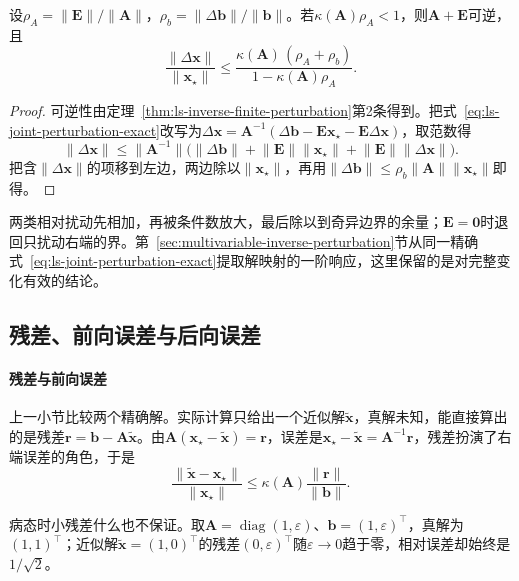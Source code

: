 \begin{theorem}[矩阵与右端同时扰动时的解误差]
\label{thm:ls-linear-system-perturbation}
设$\rho_A=\lVert\bm E\rVert/\lVert\bm A\rVert$，$\rho_b=\lVert\Delta\bm b\rVert/\lVert\bm b\rVert$。若$\kappa(\bm A)\rho_A<1$，则$\bm A+\bm E$可逆，且
\begin{equation}
 \frac{\lVert\Delta\bm x\rVert}{\lVert\bm x_\star\rVert}
 \leq\frac{\kappa(\bm A)\,(\rho_A+\rho_b)}{1-\kappa(\bm A)\rho_A}.
 \label{eq:matrix-analysis-linear-system-perturbation}
\end{equation}
\end{theorem}
\begin{proof}
可逆性由定理~\ref{thm:ls-inverse-finite-perturbation}第2条得到。把式~\eqref{eq:ls-joint-perturbation-exact}改写为$\Delta\bm x=\bm A^{-1}(\Delta\bm b-\bm E\bm x_\star-\bm E\Delta\bm x)$，取范数得
\[
 \lVert\Delta\bm x\rVert\leq\lVert\bm A^{-1}\rVert\bigl(\lVert\Delta\bm b\rVert+\lVert\bm E\rVert\lVert\bm x_\star\rVert+\lVert\bm E\rVert\lVert\Delta\bm x\rVert\bigr).
\]
把含$\lVert\Delta\bm x\rVert$的项移到左边，两边除以$\lVert\bm x_\star\rVert$，再用$\lVert\Delta\bm b\rVert\leq\rho_b\lVert\bm A\rVert\lVert\bm x_\star\rVert$即得。
\end{proof}

两类相对扰动先相加，再被条件数放大，最后除以到奇异边界的余量；$\bm E=\bm0$时退回只扰动右端的界。第~\ref{sec:multivariable-inverse-perturbation}节从同一精确式~\eqref{eq:ls-joint-perturbation-exact}提取解映射的一阶响应，这里保留的是对完整变化有效的结论。

\subsection{残差、前向误差与后向误差}
\label{sec:ls-numerical-stability}

\paragraph{残差与前向误差}
上一小节比较两个精确解。实际计算只给出一个近似解$\tilde{\bm x}$，真解未知，能直接算出的是残差$\bm r=\bm b-\bm A\tilde{\bm x}$。由$\bm A(\bm x_\star-\tilde{\bm x})=\bm r$，误差是$\bm x_\star-\tilde{\bm x}=\bm A^{-1}\bm r$，残差扮演了右端误差的角色，于是
\[
\frac{\lVert\tilde{\bm x}-\bm x_\star\rVert}{\lVert\bm x_\star\rVert}\leq\kappa(\bm A)\frac{\lVert\bm r\rVert}{\lVert\bm b\rVert}.
\]

病态时小残差什么也不保证。取$\bm A=\operatorname{diag}(1,\varepsilon)$、$\bm b=(1,\varepsilon)^\top$，真解为$(1,1)^\top$；近似解$\tilde{\bm x}=(1,0)^\top$的残差$(0,\varepsilon)^\top$随$\varepsilon\to0$趋于零，相对误差却始终是$1/\sqrt2$。

